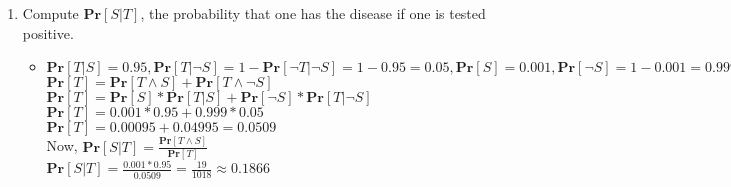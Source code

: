 \documentclass[11pt]{article}
\renewcommand{\Pr}{\ensuremath{\mathbf{Pr}}\xspace}
\begin{document}
\begin{description}
\begin{enumerate}
\begin{enumerate}
 \item
Compute $\Pr[S|T]$, the probability that one has the disease if one is tested positive.
	\begin{itemize}
	\item
	$\Pr[T|S]=0.95, \Pr[T | \neg S]= 1 - \Pr[\neg T| \neg S] = 1 - 0.95 = 0.05, \Pr[S]=0.001, \Pr[\neg S] = 1 - 0.001 = 0.999$ \\
	$\Pr[T] = \Pr[T \wedge S] + \Pr[T \wedge \neg S]$ \\
	$\Pr[T] = \Pr[S] * \Pr[T | S] + \Pr[\neg S] * \Pr[T | \neg S] $ \\
	$\Pr[T] = 0.001 * 0.95 + 0.999 * 0.05 $ \\
	$\Pr[T] = 0.00095 + 0.04995 = 0.0509$ \\
	Now, $\Pr[S|T] = \frac{ \Pr[T \wedge S]}{\Pr[T]}$ \\
	$\Pr[S|T] = \frac{0.001*0.95}{0.0509} = \frac{19}{1018} \approx 0.1866$
	\end{itemize}


\end{enumerate}
\end{enumerate}
\end{description}
\end{document}
